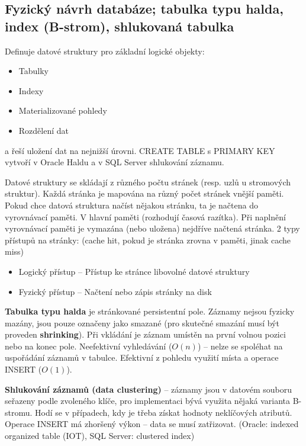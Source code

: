 \subsection{Fyzický návrh databáze; tabulka typu halda, index (B-strom), shlukovaná tabulka}
Definuje datové struktury pro základní logické objekty:
\begin{itemize}
\item Tabulky
\item Indexy
\item Materializované pohledy
\item Rozdělení dat
\end{itemize}
\noindent a řeší uložení dat na nejnižší úrovni. CREATE TABLE s PRIMARY KEY vytvoří v Oracle Haldu a v SQL Server shlukování záznamu.

Datové struktury se skládají z různého počtu stránek (resp. uzlů u stromových struktur). Každá stránka je mapována na různý počet stránek vnější paměti. Pokud chce datová struktura načíst nějakou stránku, ta je načtena do vyrovnávací paměti. V hlavní paměti (rozhodují časová razítka). Při naplnění vyrovnávací paměti je vymazána (nebo uložena) nejdříve načtená stránka.  2 typy přístupů na stránky: (cache hit, pokud je stránka zrovna v paměti, jinak cache miss)
\begin{itemize}
\item Logický přístup -- Přístup ke stránce libovolné datové struktury
\item Fyzický přístup -- Načtení nebo zápis stránky na disk
\end{itemize}

\textbf{Tabulka typu halda} je stránkované persistentní pole. Záznamy nejsou fyzicky mazány, jsou pouze označeny jako smazané (pro skutečné smazání musí být proveden \textbf{shrinking}). Při vkládání je záznam umístěn na první volnou pozici nebo na konec pole. Neefektivní vyhledávání ($O(n)$) – nelze se spoléhat na uspořádání záznamů v tabulce. Efektivní z pohledu využití místa a operace INSERT ($O(1)$).

\textbf{Shlukování záznamů (data clustering)} -- záznamy jsou v datovém souboru seřazeny podle zvoleného klíče, pro implementaci bývá využita nějaká varianta B-stromu. Hodí se v případech, kdy je třeba získat hodnoty neklíčových atributů. Operace INSERT má zhoršený  výkon – data se musí zatřizovat.
(Oracle: indexed organized table (IOT), SQL Server: clustered index)

